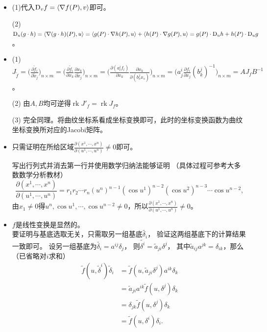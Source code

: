 \begin{itemize}
    \item[9.]
    (1)代入$\textup{D}_vf=\langle\nabla f(P),v\rangle$即可。

    (2) $\textup{D}_u(g\cdot h)=\langle\nabla(g\cdot h)(P),u\rangle
    =\langle g(P)\cdot\nabla h(P),u\rangle+\langle h(P)\cdot\nabla g(P),u\rangle
    =g(P)\cdot\textup{D}_uh+h(P)\cdot\textup{D}_ug$。

    \item[11.]
    (1) $J_{\tilde{f}}
    = \big(\frac{\partial\tilde{f}_i}{\partial \tilde{x}_j}\big)_{n \times m}
    = \big(\frac{\partial\tilde{f}_i}{\partial x_k} \frac{\partial x_k}{\partial\tilde{x}_j}\big)_{n \times m}
    = \big(\frac{\partial (a^i_l f_l)}{\partial x_k} \frac{\partial x_k}{\partial (b^j_s x_s)}\big)_{n \times m}
    = \big(a^i_j \frac{\partial f_i}{\partial x_j} (b^j_k)^{-1}\big)_{n \times m}
    = A J_f B^{-1}$。

    (2) 由$A,B$均可逆得$\operatorname{rk}J'_f=\operatorname{rk}J_f$。

    (3) 完全同理。将曲纹坐标系看成坐标变换即可，此时的坐标变换函数为曲纹坐标变换所对应的Jacobi矩阵。

    \item[12.]
    只需证明在所给区域$\frac{\partial(x^1,\cdots,x^n)}{\partial(u^1,\cdots,u^n)}\neq0$即可。

    写出行列式并消去第一行并使用数学归纳法能够证明
    （具体过程可参考大多数数学分析教材）
    $$
    \frac{\partial(x^1,\cdots,x^n)}{\partial(u^1,\cdots,u^n)}
    = r_1 r_2 \cdots r_n (u^n)^{n-1} (\cos u^1)^{n-2} (\cos u^2)^{n-3}\cdots \cos u^{n-2},
    $$
    由$x_1\neq0$得$u^n,\cos u^1,\cdots,\cos u^{n-2}\neq0$，所以$\frac{\partial(x^1,\cdots,x^n)}{\partial(u^1,\cdots,u^n)}\neq0$。

    \item[17.]
    $f$是线性变换是显然的。\\
    要证明与基底选取无关，只需取另一组基底$\tilde{\delta_i}$，
    验证这两组基底下的计算结果一致即可。
    设另一组基底为$\tilde{\delta_i} = a^{ij} \delta_j$，
    则$\tilde{\delta^i} = \tilde{a}_{ji} \delta^j$，
    其中$\tilde{a}_{ij}a^{jk}=\delta_{ik}$，那么（已省略对$i$求和）
    \begin{align*}
        \tilde{f}(u,\tilde{\delta}^i)\tilde{\delta}_i
        &=\tilde{f}(u,\tilde{a}_{ji} \delta^j)a^{ik} \delta_k\\
        &=\tilde{a}_{ji}a^{ik}\tilde{f}(u,\delta^j)\delta_k\\
        &=\delta_{jk}\tilde{f}(u,\delta^j)\delta_k\\
        &=\tilde{f}(u,\delta^i)\delta_i.
    \end{align*}


\end{itemize}

